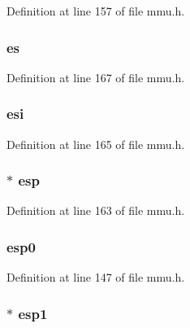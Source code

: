 Definition at line 157 of file mmu.\-h.

\hypertarget{structtaskstate_a926406c155a1238da40552b902622ab2}{
\subsubsection[{es}]{ es}}\label{structtaskstate_a926406c155a1238da40552b902622ab2}


Definition at line 167 of file mmu.\-h.

\hypertarget{structtaskstate_ab40e0917bb6e7e462049fc4151201f0a}{
\subsubsection[{esi}]{ esi}}\label{structtaskstate_ab40e0917bb6e7e462049fc4151201f0a}


Definition at line 165 of file mmu.\-h.

\hypertarget{structtaskstate_aff753e3f000b68547dbcfb705b97983d}{
\subsubsection[{esp}]{$\ast$ esp}}\label{structtaskstate_aff753e3f000b68547dbcfb705b97983d}


Definition at line 163 of file mmu.\-h.

\hypertarget{structtaskstate_a105b1107443842b93c88ade5254ab9d2}{
\subsubsection[{esp0}]{ esp0}}\label{structtaskstate_a105b1107443842b93c88ade5254ab9d2}


Definition at line 147 of file mmu.\-h.

\hypertarget{structtaskstate_acd0d21f790060be5f36be94fed86be0f}{
\subsubsection[{esp1}]{$\ast$ esp1}}\label{structtaskstate_acd0d21f790060be5f36be94fed86be0f}


